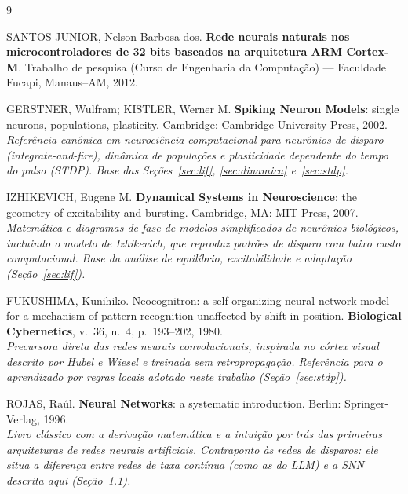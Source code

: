 \documentclass[11pt,a4paper]{article}
\begin{document}
\clearpage
{}
{}
\renewcommand{\refname}{Referências bibliográficas}
\begin{thebibliography}{9}
\setlength{\itemsep}{0.6em}

SANTOS JUNIOR, Nelson Barbosa dos. \textbf{Rede neurais naturais nos microcontroladores de 32 bits baseados na arquitetura
ARM Cortex-M}. Trabalho de pesquisa (Curso de Engenharia da Computação) — Faculdade Fucapi, Manaus–AM, 2012.

GERSTNER, Wulfram; KISTLER, Werner M. \textbf{Spiking Neuron Models}: single neurons, populations, plasticity.
Cambridge: Cambridge University Press, 2002.\\
\emph{Referência canônica em neurociência computacional para neurônios de disparo (\emph{integrate-and-fire}), dinâmica de
populações e plasticidade dependente do tempo do pulso (STDP). Base das Seções~\ref{sec:lif}, \ref{sec:dinamica} e~\ref{sec:stdp}.}

IZHIKEVICH, Eugene M. \textbf{Dynamical Systems in Neuroscience}: the geometry of excitability and bursting.
Cambridge, MA: MIT Press, 2007.\\
\emph{Matemática e diagramas de fase de modelos simplificados de neurônios biológicos, incluindo o modelo de Izhikevich, que
reproduz padrões de disparo com baixo custo computacional. Base da análise de equilíbrio, excitabilidade e adaptação
(Seção~\ref{sec:lif}).}

FUKUSHIMA, Kunihiko. Neocognitron: a self-organizing neural network model for a mechanism of pattern recognition unaffected
by shift in position. \textbf{Biological Cybernetics}, v.~36, n.~4, p.~193--202, 1980.\\
\emph{Precursora direta das redes neurais convolucionais, inspirada no córtex visual descrito por Hubel e Wiesel e treinada sem
retropropagação. Referência para o aprendizado por regras locais adotado neste trabalho (Seção~\ref{sec:stdp}).}

ROJAS, Raúl. \textbf{Neural Networks}: a systematic introduction. Berlin: Springer-Verlag, 1996.\\
\emph{Livro clássico com a derivação matemática e a intuição por trás das primeiras arquiteturas de redes neurais
artificiais. Contraponto às redes de disparos: ele situa a diferença entre redes de taxa contínua (como as do LLM) e a
SNN descrita aqui (Seção~1.1).}

\end{thebibliography}
\end{document}
